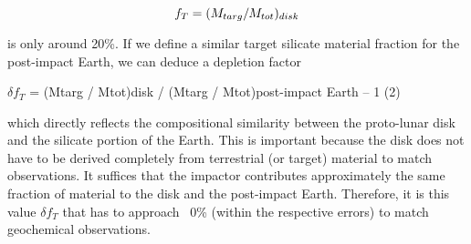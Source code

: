 \begin{equation}
f_T = (M_{targ} / M_{tot})_{disk}
\end{equation}


is only around 20\%. If we define a similar target silicate material fraction for the post-impact Earth, we can deduce a depletion factor
  
$\delta f_{T}$ = (Mtarg / Mtot)disk / (Mtarg / Mtot)post-impact Earth – 1 (2)

which directly reflects the compositional similarity between the proto-lunar disk and the silicate portion of the Earth. This is important because the disk does not have to be derived completely from terrestrial (or target) material to match observations. It suffices that  the impactor contributes approximately the same fraction of material to the disk and the post-impact Earth. Therefore, it is this value $\delta f_{T}$ that has to approach ~0\% (within the respective errors) to match geochemical observations.

